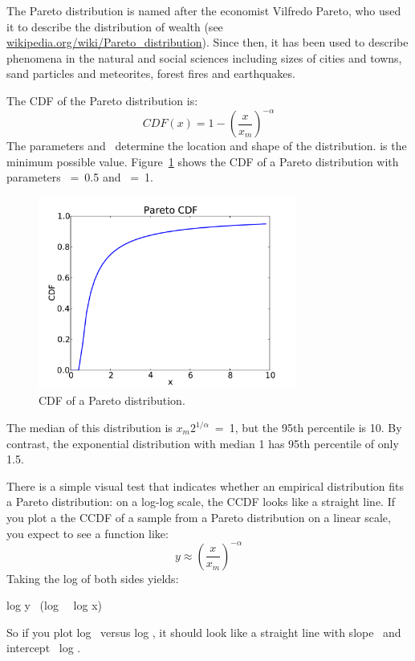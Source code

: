 \documentclass[12pt]{book}
\begin{document}
The Pareto distribution is named after the economist Vilfredo Pareto,
who used it to describe the distribution of wealth (see
\url{wikipedia.org/wiki/Pareto_distribution}).  Since then, it has
been used to describe phenomena in the natural and social
sciences including sizes of cities and towns, sand particles and
meteorites, forest fires and earthquakes.

The CDF of the Pareto distribution is:
%
\[ CDF(x) = 1 - \left( \frac{x}{x_m} \right) ^{-\alpha} \]
%
The parameters \x {} and \myalpha~determine the location and shape of
the distribution. \x {} is the minimum possible value.
Figure~\ref{pareto_cdf} shows the CDF of a Pareto distribution with
parameters \x {}~=~0.5 and \myalpha~=~1.

\begin{figure}
\centerline{\includegraphics[height=2.5in]{figs/pareto_cdf.pdf}}
\caption{CDF of a Pareto distribution.}
\label{pareto_cdf}
\end{figure}

The median of this distribution is $x_m 2^{1/\alpha}$~=~1, but the
95th percentile is 10.  By contrast, the exponential distribution
with median 1 has 95th percentile of only 1.5.

There is a simple visual test that indicates whether an empirical
distribution fits a Pareto distribution: on a log-log scale, the CCDF
looks like a straight line.
If you plot a the CCDF of a sample from a Pareto distribution on a
linear scale, you expect to see a function like:
%
\[ y \approx \left( \frac{x}{x_m} \right) ^{-\alpha} \]
%
Taking the log of both sides yields:

\quad log y \myapprox \minus\myalpha~(log \x~\minus~log x)

So if you plot log \y~versus log \x, it should look like a straight
line with slope \minus\myalpha~and intercept
\minus\myalpha~log \x{}.
\end{document}
